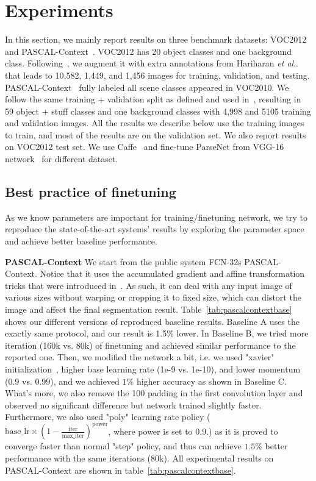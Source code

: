 \documentclass{article} %
\makeatletter
\DeclareRobustCommand\onedot{\futurelet\@let@token\@onedot}
\def\@onedot{\ifx\@let@token.\else.\null\fi\xspace}
\def\etal{\emph{et al}\onedot}
\makeatother
\begin{document}
\section{Experiments}
\label{sec:experiment}
In this section, we mainly report results on three benchmark datasets: VOC2012~\cite{everingham2014pascal} and PASCAL-Context~\cite{mottaghi2014role}. VOC2012 has 20 object classes and one background class. Following~\cite{long2014fully, chen2014semantic}, we augment it with extra annotations from Hariharan \etal~\cite{hariharan2011semantic} that leads to 10,582, 1,449, and 1,456 images for training, validation, and testing. PASCAL-Context~\cite{mottaghi2014role} fully labeled all scene classes appeared in VOC2010. We follow the same training + validation split as defined and used in~\cite{mottaghi2014role, long2014fully}, resulting in 59 object + stuff classes and one background classes with 4,998 and 5105 training and validation images. All the results we describe below use the training images to train, and most of the results are on the validation set. We also report results on VOC2012 test set. We use Caffe~\cite{jia2013caffe} and fine-tune ParseNet from VGG-16 network~\cite{simonyan2014very} for different dataset.

\subsection{Best practice of finetuning}
As we know parameters are important for training/finetuning network, we try to reproduce the state-of-the-art systems' results by exploring the parameter space and achieve better baseline performance.

\noindent\textbf{PASCAL-Context} We start from the public system FCN-32s PASCAL-Context. Notice that it uses the accumulated gradient and affine transformation tricks that were introduced in~\cite{long2014fully}. As such, it can deal with any input image of various sizes without warping or cropping it to fixed size, which can distort the image and affect the final segmentation result. Table~\ref{tab:pascalcontextbase} shows our different versions of reproduced baseline results. Baseline A uses the exactly same protocol, and our result is 1.5\% lower. In Baseline B, we tried more iteration (160k vs. 80k) of finetuning and achieved similar performance to the reported one. Then, we modified the network a bit, i.e. we used "xavier" initialization~\cite{glorot2010understanding}, higher base learning rate (1e-9 vs. 1e-10), and lower momentum (0.9 vs. 0.99), and we achieved $1\%$ higher accuracy as shown in Baseline C. What's more, we also remove the 100 padding in the first convolution layer and observed no significant difference but network trained slightly faster. Furthermore, we also used "poly" learning rate policy ($\text{base\_lr}\times (1 - \frac{\text{iter}}{\text{max\_iter}})^{\text{power}}$, where power is set to 0.9.) as it is proved to converge faster than normal "step" policy, and thus can achieve $1.5\%$ better performance with the same iterations (80k). All experimental results on PASCAL-Context are shown in table~\ref{tab:pascalcontextbase}.
\end{document}

